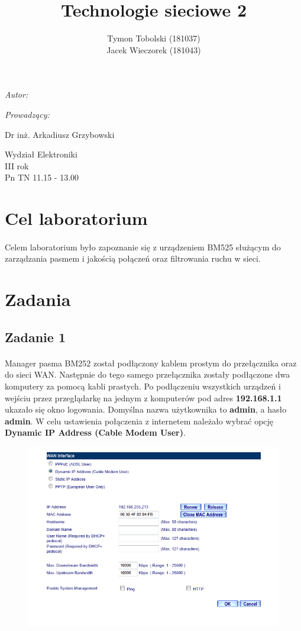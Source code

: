 \documentclass[wide,a4paper,titlepage,12pt] {article}
\title{Technologie sieciowe 2}
\author{Tymon Tobolski (181037)\\ Jacek Wieczorek (181043)}
\makeatletter
\renewcommand{\maketitle}{
\begin{titlepage}
  \begin{center}
    \vspace*{3cm}
    \LARGE \@title \par
    \vspace{2cm}
    \textit{\small Autor:}\par
    \normalsize \@author\par \normalsize
    \vspace{3cm}
    \textit{\small Prowadzący:}\par
    Dr inż. Arkadiusz Grzybowski\par
    \vspace{2cm}
    Wydział Elektroniki\\ III rok\\ Pn TN 11.15 - 13.00\par
    \vspace{4cm}
    \small \@date
  \end{center}
\end{titlepage}
}
\makeatother
\begin{document}
\maketitle
  \section{Cel laboratorium}
  \paragraph{}
  Celem laboratorium było zapoznanie się z urządzeniem BM525 służącym do zarządzania pasmem i jakością połączeń oraz filtrowania ruchu w sieci.


  \section{Zadania}


  \subsection{Zadanie 1}
  \paragraph{}
  Manager pasma BM252 został podłączony kablem prostym do przełącznika oraz do sieci WAN. Następnie do tego samego przełącznika zostały podłączone dwa komputery za pomocą kabli prastych.
  Po podłączeniu wszystkich urządzeń i wejściu przez przeglądarkę na jednym z komputerów pod adres \textbf{192.168.1.1} ukazało się okno logowania. Domyślna nazwa użytkownika to \textbf{admin}, a hasło \textbf{admin}.
  W celu ustawienia połączenia z internetem należało wybrać opcję \textbf{Dynamic IP Address (Cable Modem User)}.

  \begin{figure}[h!]
    \begin{center}
      \includegraphics[width=\textwidth]{1.PNG}
    \end{center}
  \end{figure}
\end{document}
